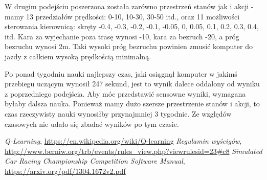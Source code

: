 \documentclass{article}
\begin{document}
W drugim podejściu poszerzona została zarówno przestrzeń stanów jak i akcji - mamy 13 przedziałów prędkości: 0-10, 10-30, 30-50 itd., oraz 11 możliwości sterowania kierownicą: skręty -0.4, -0.3, -0.2, -0.1, -0.05, 0, 0.05, 0.1, 0.2, 0.3, 0.4, itd. Kara za wyjechanie poza trasę wynosi -10, kara za bezruch -20, a próg bezruchu wynosi 2m. Taki wysoki próg bezruchu powinien zmusić komputer do jazdy z całkiem wysoką prędkością minimalną.

Po ponad tygodniu nauki najlepszy czas, jaki osiągnął komputer w jakimś przebiegu uczącym wynosił 247 sekund, jest to wynik dalece oddalony od wyniku z poprzedniego podejścia. Aby móc przedstawić sensowne wyniki, wymagana byłaby dalsza nauka. Ponieważ mamy dużo szersze przestrzenie stanów i akcji, to czas rzeczywisty nauki wynosiłby przynajmniej 3 tygodnie. Ze względów czasowych nie udało się zbadać wyników po tym czasie.




\begin{thebibliography}{9} 

\emph{Q-Learning},
\url{https://en.wikipedia.org/wiki/Q-learning}
\emph{Regulamin wyścigów},
\url{http://www.berniw.org/trb/events/rules_view.php?viewrulesid=23#c8}
\emph{Simulated Car Racing Championship
Competition Software Manual},
\url{https://arxiv.org/pdf/1304.1672v2.pdf}

\end{thebibliography}
\end{document}
